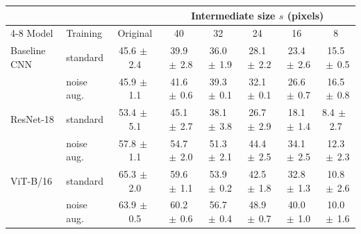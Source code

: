 \begin{tabular}{llcccccc}
\toprule
 & & & \multicolumn{5}{c}{Intermediate size $s$ (pixels)} \\
\cmidrule(lr){4-8}
Model & Training & Original & 40 & 32 & 24 & 16 & 8 \\
\midrule
Baseline CNN & standard & 45.6{\scriptsize$\,\pm\,$2.4} & 39.9{\scriptsize$\,\pm\,$2.8} & 36.0{\scriptsize$\,\pm\,$1.9} & 28.1{\scriptsize$\,\pm\,$2.2} & 23.4{\scriptsize$\,\pm\,$2.6} & 15.5{\scriptsize$\,\pm\,$0.5} \\
 & noise aug. & 45.9{\scriptsize$\,\pm\,$1.1} & 41.6{\scriptsize$\,\pm\,$0.6} & 39.3{\scriptsize$\,\pm\,$0.1} & 32.1{\scriptsize$\,\pm\,$0.1} & 26.6{\scriptsize$\,\pm\,$0.7} & 16.5{\scriptsize$\,\pm\,$0.8} \\
\addlinespace
ResNet-18 & standard & 53.4{\scriptsize$\,\pm\,$5.1} & 45.1{\scriptsize$\,\pm\,$2.7} & 38.1{\scriptsize$\,\pm\,$3.8} & 26.7{\scriptsize$\,\pm\,$2.9} & 18.1{\scriptsize$\,\pm\,$1.4} & 8.4{\scriptsize$\,\pm\,$2.7} \\
 & noise aug. & 57.8{\scriptsize$\,\pm\,$1.1} & 54.7{\scriptsize$\,\pm\,$2.0} & 51.3{\scriptsize$\,\pm\,$2.1} & 44.4{\scriptsize$\,\pm\,$2.5} & 34.1{\scriptsize$\,\pm\,$2.5} & 12.3{\scriptsize$\,\pm\,$2.3} \\
\addlinespace
ViT-B/16 & standard & 65.3{\scriptsize$\,\pm\,$2.0} & 59.6{\scriptsize$\,\pm\,$1.1} & 53.9{\scriptsize$\,\pm\,$0.2} & 42.5{\scriptsize$\,\pm\,$1.8} & 32.8{\scriptsize$\,\pm\,$1.3} & 10.8{\scriptsize$\,\pm\,$2.6} \\
 & noise aug. & 63.9{\scriptsize$\,\pm\,$0.5} & 60.2{\scriptsize$\,\pm\,$0.6} & 56.7{\scriptsize$\,\pm\,$0.4} & 48.9{\scriptsize$\,\pm\,$0.7} & 40.0{\scriptsize$\,\pm\,$1.0} & 10.0{\scriptsize$\,\pm\,$1.6} \\
\bottomrule
\end{tabular}
